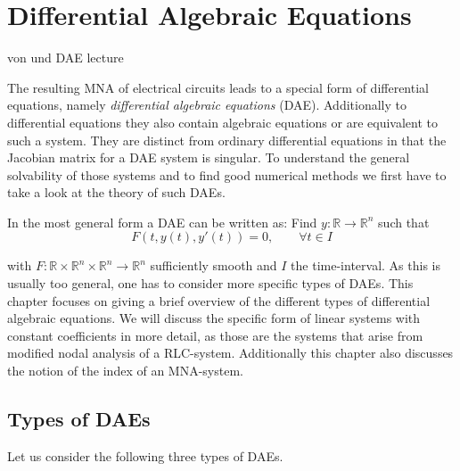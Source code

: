 \chapter{Differential Algebraic Equations}

\label{sec:Differential Algebraic equations}

von \cite{NumerikGewöhnlicherDifferentialgleichungen} und DAE lecture

The resulting MNA of electrical circuits leads to a special form of differential equations, namely \emph{differential algebraic equations} (DAE). Additionally to differential equations they also contain algebraic equations or are equivalent to such a system. They are distinct from ordinary differential equations in that the Jacobian matrix for a DAE system is singular. 
To understand the general solvability of those systems and to find good numerical methods we first have to take a look at the theory of such DAEs.

In the most general form a DAE can be written as:
Find $y:\mathbb{R} \to \mathbb{R}^n$ such that
\begin{equation}
	\label{Abstract_DAE}
	F(t, y(t), y'(t)) = 0, \qquad \forall t \in I
\end{equation}

with $F:\mathbb{R} \times \mathbb{R}^n \times \mathbb{R}^n \to \mathbb{R}^n$ sufficiently smooth and $I$ the time-interval. As this is usually too general, one has to consider more specific types of DAEs.
This chapter focuses on giving a brief overview of the different types of differential algebraic equations. We will discuss the specific form of linear systems with constant coefficients in more detail, as those are the systems that arise from modified nodal analysis of a RLC-system. Additionally this chapter also discusses the notion of the index of an MNA-system.

\section{Types of DAEs}

	Let us consider the following three types of DAEs.
	
